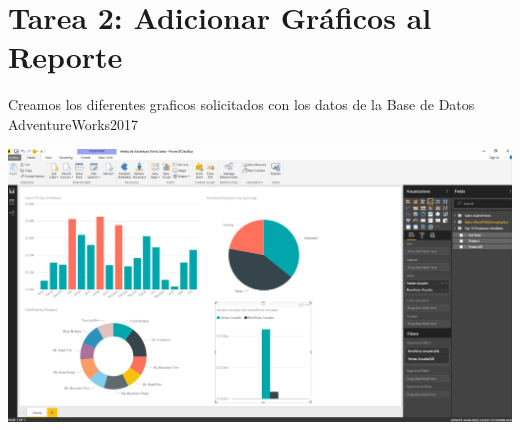 \section{Tarea 2: Adicionar Gráficos al Reporte} 

Creamos los diferentes graficos solicitados con los datos de la Base de Datos AdventureWorks2017
	\begin{center}
	\includegraphics[width=17cm]{./Imagenes/6}
	\end{center}	
